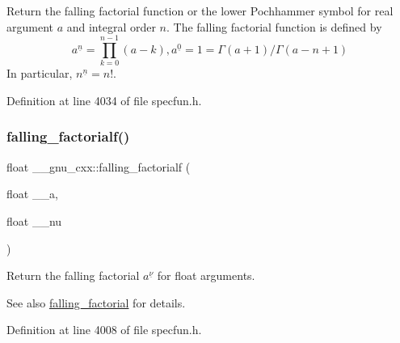 Return the falling factorial function or the lower Pochhammer symbol for real argument $ a $ and integral order $ n $. The falling factorial function is defined by \[ a^{\underline{n}} = \prod_{k=0}^{n-1} (a - k), a^{\underline{0}} = 1 = \Gamma(a + 1) / \Gamma(a - n + 1) \] In particular, $ n^{\underline{n}} = n! $. 



Definition at line 4034 of file specfun.\+h.

\mbox{\label{group__gnu__math__spec__func_gaf32abbc790bfa870725728e5470de532}} 
\subsubsection{\texorpdfstring{falling\+\_\+factorialf()}{falling\_factorialf()}}
{\footnotesize\ttfamily float \+\_\+\+\_\+gnu\+\_\+cxx\+::falling\+\_\+factorialf (\begin{DoxyParamCaption}\item[{float}]{\+\_\+\+\_\+a,  }\item[{float}]{\+\_\+\+\_\+nu }\end{DoxyParamCaption})\hspace{0.3cm}{\ttfamily [inline]}}

Return the falling factorial $ a^{\underline{\nu}} $ for float arguments.

\begin{DoxySeeAlso}{See also}
\hyperlink{group__gnu__math__spec__func_ga3cc8eb6068c7155ec48b40e20160c5c0}{falling\+\_\+factorial} for details. 
\end{DoxySeeAlso}


Definition at line 4008 of file specfun.\+h.

\mbox{\label{group__gnu__math__spec__func_gab816c3bcbe00595881799ce969475085}} 
